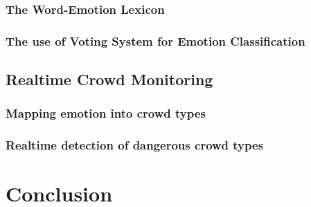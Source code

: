 \subsubsection{The Word-Emotion Lexicon}

\subsubsection{The use of Voting System for Emotion Classification}

\subsection{Realtime Crowd Monitoring}

\subsubsection{Mapping emotion into crowd types}

\subsubsection{Realtime detection of dangerous crowd types}

\section{Conclusion}